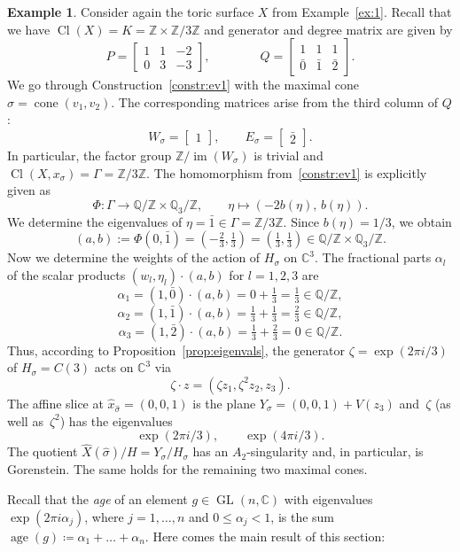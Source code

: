 \documentclass{amsart}
\newcommand{\C}{\mathbb{C}}
\newcommand{\Q}{\mathbb{Q}}
\newcommand{\Z}{\mathbb{Z}}
\DeclareMathOperator{\Cl}{Cl}
\DeclareMathOperator{\GL}{GL}
\DeclareMathOperator{\im}{im}
\DeclareMathOperator{\cone}{cone}
\DeclareMathOperator{\age}{age}
\theoremstyle{plain}
\theoremstyle{definition}
\newtheorem{example}[theorem]{Example}
\begin{document}
\begin{example}\label{ex:2}
Consider again the toric surface $X$ from Example~\ref{ex:1}.
Recall that we have $\Cl(X) = K = \Z\times\Z/3\Z$ and
generator and degree matrix are given by
$$
P=\begin{bmatrix}
1 & 1 & -2
\\
0 & 3 & -3
\end{bmatrix},
\qquad\qquad
Q
=
\begin{bmatrix}
1 & 1 & 1
\\
\bar{0} & \bar{1} & \bar{2}
\end{bmatrix}.
$$
We go through Construction~\ref{constr:ev1} with
the maximal cone $\sigma=\cone(v_1,v_2)$.
The corresponding matrices arise from the third
column of $Q$:
\[
W_\sigma=\begin{bmatrix}1\end{bmatrix},
\qquad
E_\sigma=\begin{bmatrix}\bar{2}\end{bmatrix}.
\]
In particular, the factor group $\Z/\im(W_\sigma)$ is trivial
and $\Cl(X,x_\sigma)=\Gamma=\Z/3\Z$.
The homomorphism from~\ref{constr:ev1} is explicitly given
as 
\[
\Phi\colon \Gamma \to \Q/\Z\times \Q_3/\Z,
\qquad
\eta \mapsto (-2b(\eta),\,b(\eta)).
\]
We determine the eigenvalues of $\eta=\bar{1} \in\Gamma=\Z/3\Z$.
Since $b(\eta)=1/3$, we obtain
\[
(a,b)
:=
\Phi(0,\bar{1})
=
\left(-\tfrac{2}{3},\tfrac{1}{3}\right)
=
\left(\tfrac{1}{3},\tfrac{1}{3}\right)
\in
\Q/\Z\times \Q_3/\Z.
\]
Now we determine the weights of the action of $H_\sigma$ on
$\C^3$.
The fractional parts $\alpha_l$ of the scalar products
$(w_l,\eta_l) \cdot (a,b)$ for $l=1,2,3$ are
\[
\alpha_1 = (1,\bar 0) \cdot (a,b) = 0+\tfrac{1}{3} = \tfrac{1}{3} \in \Q/\Z,
\]
\[
\alpha_2 = (1,\bar 1) \cdot(a,b) = \tfrac{1}{3}+\tfrac{1}{3} = \tfrac{2}{3} \in \Q/\Z,
\]
\[
\alpha_3 = (1,\bar 2) \cdot(a,b) = \tfrac{1}{3}+\tfrac{2}{3} = 0 \in \Q/\Z.
\]
Thus, according to Proposition~\ref{prop:eigenvals}, the generator $\zeta = \exp(2\pi i/3)$
of $H_\sigma = C(3)$ acts on $\C^3$ via
\[
\zeta \cdot z = (\zeta z_1, \zeta^2 z_2, z_3).
\]
The affine slice at $\hat x_{\hat \sigma} = (0,0,1)$ is the
plane $Y_\sigma = (0,0,1) + V(z_3)$
and~$\zeta$ (as well as~$\zeta^2$) has the eigenvalues
\[
\exp(2\pi i/3),\qquad \exp(4\pi i/3).
\]
The quotient $\hat X({\hat \sigma}) / H = Y_\sigma/ H_\sigma$ has
an $A_2$-singularity and, in particular, is Gorenstein.
The same holds for the remaining two maximal cones.
\end{example}


Recall that the \emph{age} of an element $g \in \GL(n,\C)$ with
eigenvalues $\exp(2\pi i\alpha_j)$, where $j = 1, \ldots, n$
and $0\le \alpha_j<1$, is the sum $\age(g)\coloneqq \alpha_1+\dots+\alpha_n$.
Here comes the main result of this section:
\end{document}
